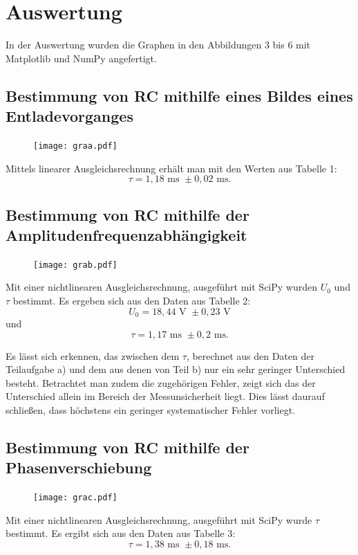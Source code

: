 \section{Auswertung}
\label{sec:Auswertung}
In der Auswertung wurden die Graphen in den Abbildungen 3 bis 6 mit Matplotlib \cite{matplotlib} und NumPy \cite{numpy} angefertigt.

\subsection{Bestimmung von RC mithilfe eines Bildes eines Entladevorganges}
\begin{figure}[H]
	\centering
	\caption{}
	\texttt{[image: graa.pdf]}
	\label{fig:graa}
\end{figure}


Mittels linearer Ausgleichsrechnung erhält man mit den Werten aus Tabelle 1:
\begin{displaymath}
\tau = 1,18 \text{ ms } \pm 0,02 \text{ ms.} 
\end{displaymath}
\subsection{Bestimmung von RC mithilfe der Amplitudenfrequenzabhängigkeit}
\begin{figure}[H]
	\centering
	\caption{}
	\texttt{[image: grab.pdf]}
	\label{fig:grab}
\end{figure}
Mit einer nichtlinearen Ausgleichsrechnung, ausgeführt mit SciPy \cite{scipy} wurden $U_0$ und $\tau$ bestimmt. Es ergeben sich aus den Daten aus Tabelle 2:
\begin{displaymath}
U_0 = 18,44 \text{ V } \pm 0,23 \text{ V}
\end{displaymath}
und
\begin{displaymath}
\tau = 1,17  \text{ ms } \pm 0,2 \text{ ms.}
\end{displaymath}




Es lässt sich erkennen, das zwischen dem $\tau$, berechnet aus den Daten der
 Teilaufgabe a) und dem aus denen von Teil b) nur ein sehr geringer Unterschied
  besteht. Betrachtet man zudem die zugehörigen Fehler, zeigt sich das der
	Unterschied allein im Bereich der Messunsicherheit liegt. Dies lässt daurauf
	 schließen, dass höchstens ein geringer systematischer Fehler vorliegt.

\subsection{Bestimmung von RC mithilfe der Phasenverschiebung}
	 \begin{figure}[H]
	 	\centering
	 	\caption{}
	 	\texttt{[image: grac.pdf]}
	 	\label{fig:grac}
	 \end{figure}
	 
	 Mit einer nichtlinearen Ausgleichsrechnung, ausgeführt mit SciPy \cite{scipy} wurde $\tau$ bestimmt. Es ergibt sich aus den Daten aus Tabelle 3:
	 \begin{displaymath}
	 \tau = 1,38  \text{ ms } \pm 0,18 \text{ ms.}
	 \end{displaymath}
	 

